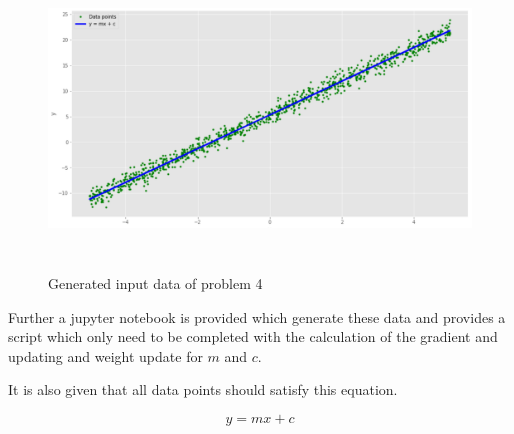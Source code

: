 \begin{figure}[h]
	\centering
	\includegraphics[height=8cm]{img/problem4_imput_data.png}
	\caption{Generated input data of problem 4}
    \label{problem4_imput_data}
\end{figure}

Further a jupyter notebook is provided which generate these data and provides a script which only need to be completed with the calculation of the gradient and updating and weight update for $m$ and $c$.

It is also given that all data points should satisfy this equation.

\begin{equation}\label{gradients1}
    y = mx + c
\end{equation}


